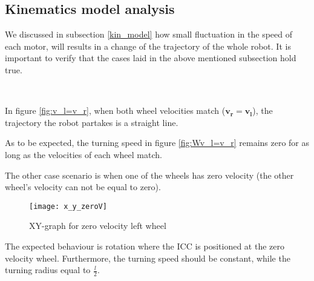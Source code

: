 \subsection{Kinematics model analysis} \label{kin_analysis}

We discussed in subsection \ref{kin_model} how small fluctuation in the speed of each motor, will results in a change of the trajectory of the whole robot. It is important to verify that the cases laid in the above mentioned subsection hold true.

    ~ %

In figure \ref{fig:v_l=v_r}, when both wheel velocities match ($\boldsymbol{v_r = v_l}$), the trajectory the robot partakes is a straight line. 

As to be expected, the turning speed in figure \ref{fig:Wv_l=v_r} remains zero for as long as the velocities of each wheel match.

\newpage

The other case scenario is when one of the wheels has zero velocity (the other wheel's velocity can not be equal to zero).

\begin{figure}[h]
\centering
\texttt{[image: x\_y\_zeroV]}
\caption{XY-graph for zero velocity left wheel}
\label{fig::ZeroV}
\end{figure} 

The expected behaviour is rotation where the ICC is positioned at the zero velocity wheel. Furthermore, the turning speed should be constant, while the turning radius equal to $\frac{l}{2}$.

